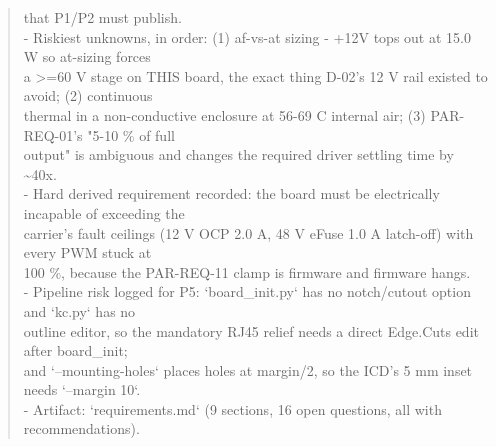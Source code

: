 \documentclass[11pt,a4paper]{article}
\begin{document}
\begin{quote}
  that P1/P2 must publish.\\
- Riskiest unknowns, in order: (1) af-vs-at sizing - +12V tops out at 15.0 W so at-sizing forces\\
  a \textgreater{}=60 V stage on THIS board, the exact thing D-02's 12 V rail existed to avoid; (2) continuous\\
  thermal in a non-conductive enclosure at 56-69 C internal air; (3) PAR-REQ-01's "5-10 \% of full\\
  output" is ambiguous and changes the required driver settling time by \textasciitilde{}40x.\\
- Hard derived requirement recorded: the board must be electrically incapable of exceeding the\\
  carrier's fault ceilings (12 V OCP 2.0 A, 48 V eFuse 1.0 A latch-off) with every PWM stuck at\\
  100 \%, because the PAR-REQ-11 clamp is firmware and firmware hangs.\\
- Pipeline risk logged for P5: `board\_init.py` has no notch/cutout option and `kc.py` has no\\
  outline editor, so the mandatory RJ45 relief needs a direct Edge.Cuts edit after board\_init;\\
  and `--mounting-holes` places holes at margin/2, so the ICD's 5 mm inset needs `--margin 10`.\\
- Artifact: `requirements.md` (9 sections, 16 open questions, all with recommendations).
\end{quote}
\end{document}
